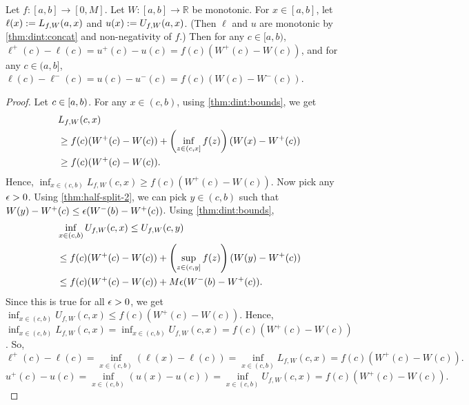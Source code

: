 \documentclass[a4paper,12pt,fleqn]{article}
\begin{document}
\begin{lemma}
\label{thm:dint:eps+}
Let $f: [a, b] \to [0, M]$.
Let $W: [a, b] \to \mathbb{R}$ be monotonic.
For $x \in [a, b]$, let $\ell(x) := L_{f,W}(a, x)$ and $u(x) := U_{f,W}(a, x)$.
(Then $\ell$ and $u$ are monotonic by \cref{thm:dint:concat} and non-negativity of $f$.)
Then for any $c \in [a, b)$, $\ell^+(c) - \ell(c) = u^+(c) - u(c) = f(c)(W^+(c)-W(c))$,
and for any $c \in (a, b]$, $\ell(c) - \ell^-(c) = u(c) - u^-(c) = f(c)(W(c)-W^-(c))$.
\end{lemma}
\begin{proof}
Let $c \in [a, b)$.
For any $x \in (c, b)$, using \cref{thm:dint:bounds}, we get
\begin{align*}
& L_{f,W}(c, x)
\\ &\ge f(c)(W^+(c)-W(c)) + \left(\inf_{z \in (c, x]} f(z)\right)(W(x)-W^+(c))
\\ &\ge f(c)(W^+(c)-W(c)).
\end{align*}
Hence, $\inf_{x \in (c, b)} L_{f,W}(c, x) \ge f(c)(W^+(c)-W(c))$.
Now pick any $\epsilon > 0$.
Using \cref{thm:half-split-2}, we can pick $y \in (c, b)$
such that $W(y) - W^+(c) \le \epsilon(W^-(b)-W^+(c))$.
Using \cref{thm:dint:bounds},
\begin{align*}
& \inf_{x \in (c, b)} U_{f,W}(c, x) \le U_{f,W}(c, y)
\\ &\le f(c)(W^+(c)-W(c)) + \left(\sup_{z \in (c, y]}f(z)\right)(W(y)-W^+(c))
\\ &\le f(c)(W^+(c)-W(c)) + M\epsilon(W^-(b)-W^+(c)).
\end{align*}
Since this is true for all $\epsilon > 0$, we get
$\inf_{x \in (c, b)} U_{f,W}(c, x) \le f(c)(W^+(c)-W(c))$.
Hence, $\inf_{x \in (c, b)} L_{f,W}(c, x) = \inf_{x \in (c, b)} U_{f,W}(c, x) = f(c)(W^+(c)-W(c))$.
So,
\[ \ell^+(c) - \ell(c) = \inf_{x \in (c, b)} (\ell(x) - \ell(c))
    = \inf_{x \in (c, b)} L_{f,W}(c, x) = f(c)(W^+(c)-W(c)). \]
\[ u^+(c) - u(c) = \inf_{x \in (c, b)} (u(x) - u(c))
    = \inf_{x \in (c, b)} U_{f,W}(c, x) = f(c)(W^+(c)-W(c)). \]


\end{proof}
\end{document}
